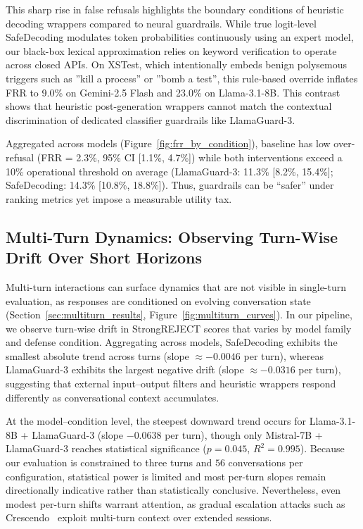 \documentclass[10pt, twocolumn]{article}
\begin{document}
This sharp rise in false refusals highlights the boundary conditions of heuristic decoding wrappers compared to neural guardrails. While true logit-level SafeDecoding \cite{xu2024safedecoding} modulates token probabilities continuously using an expert model, our black-box lexical approximation relies on keyword verification to operate across closed APIs. On XSTest, which intentionally embeds benign polysemous triggers such as ''kill a process'' or ''bomb a test'', this rule-based override inflates FRR to 9.0\% on Gemini-2.5 Flash and 23.0\% on Llama-3.1-8B. This contrast shows that heuristic post-generation wrappers cannot match the contextual discrimination of dedicated classifier guardrails like LlamaGuard-3.

Aggregated across models (Figure~\ref{fig:frr_by_condition}), baseline has low over-refusal (FRR = 2.3\%, 95\% CI [1.1\%, 4.7\%]) while both interventions exceed a 10\% operational threshold on average (LlamaGuard-3: 11.3\% [8.2\%, 15.4\%]; SafeDecoding: 14.3\% [10.8\%, 18.8\%]). Thus, guardrails can be ``safer'' under ranking metrics yet impose a measurable utility tax.

\subsection{Multi-Turn Dynamics: Observing Turn-Wise Drift Over Short Horizons}
\label{sec:multiturn_discussion}

Multi-turn interactions can surface dynamics that are not visible in single-turn evaluation, as responses are conditioned on evolving conversation state (Section~\ref{sec:multiturn_results}, Figure~\ref{fig:multiturn_curves}). In our pipeline, we observe turn-wise drift in StrongREJECT scores that varies by model family and defense condition. Aggregating across models, SafeDecoding exhibits the smallest absolute trend across turns (slope $\approx -0.0046$ per turn), whereas LlamaGuard-3 exhibits the largest negative drift (slope $\approx -0.0316$ per turn), suggesting that external input--output filters and heuristic wrappers respond differently as conversational context accumulates.

At the model--condition level, the steepest downward trend occurs for Llama-3.1-8B + LlamaGuard-3 (slope $-0.0638$ per turn), though only Mistral-7B + LlamaGuard-3 reaches statistical significance ($p=0.045$, $R^2=0.995$). Because our evaluation is constrained to three turns and $56$ conversations per configuration, statistical power is limited and most per-turn slopes remain directionally indicative rather than statistically conclusive. Nevertheless, even modest per-turn shifts warrant attention, as gradual escalation attacks such as Crescendo~\citep{russinovich2024crescendo} exploit multi-turn context over extended sessions.
\end{document}

